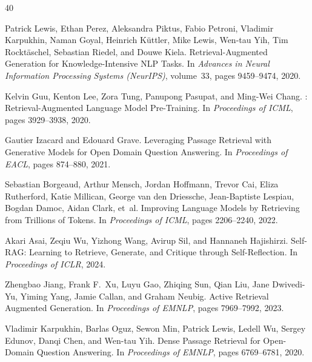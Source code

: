 \documentclass[11pt]{article}
\begin{document}

\begin{thebibliography}{40}


Patrick Lewis, Ethan Perez, Aleksandra Piktus, Fabio Petroni, Vladimir
Karpukhin, Naman Goyal, Heinrich K\"{u}ttler, Mike Lewis, Wen-tau Yih,
Tim Rockt\"{a}schel, Sebastian Riedel, and Douwe Kiela.
\newblock Retrieval-Augmented Generation for Knowledge-Intensive {NLP} Tasks.
\newblock In \emph{Advances in Neural Information Processing Systems
(NeurIPS)}, volume~33, pages 9459--9474, 2020.

Kelvin Guu, Kenton Lee, Zora Tung, Panupong Pasupat, and Ming-Wei Chang.
: Retrieval-Augmented Language Model Pre-Training.
\newblock In \emph{Proceedings of ICML}, pages 3929--3938, 2020.

Gautier Izacard and Edouard Grave.
\newblock Leveraging Passage Retrieval with Generative Models for Open Domain
Question Answering.
\newblock In \emph{Proceedings of EACL}, pages 874--880, 2021.

Sebastian Borgeaud, Arthur Mensch, Jordan Hoffmann, Trevor Cai, Eliza
Rutherford, Katie Millican, George van den Driessche, Jean-Baptiste Lespiau,
Bogdan Damoc, Aidan Clark, et~al.
\newblock Improving Language Models by Retrieving from Trillions of Tokens.
\newblock In \emph{Proceedings of ICML}, pages 2206--2240, 2022.

Akari Asai, Zeqiu Wu, Yizhong Wang, Avirup Sil, and Hannaneh Hajishirzi.
\newblock Self-{RAG}: Learning to Retrieve, Generate, and Critique through
Self-Reflection.
\newblock In \emph{Proceedings of ICLR}, 2024.

Zhengbao Jiang, Frank F.\ Xu, Luyu Gao, Zhiqing Sun, Qian Liu, Jane
Dwivedi-Yu, Yiming Yang, Jamie Callan, and Graham Neubig.
\newblock Active Retrieval Augmented Generation.
\newblock In \emph{Proceedings of EMNLP}, pages 7969--7992, 2023.


Vladimir Karpukhin, Barlas Oguz, Sewon Min, Patrick Lewis, Ledell Wu, Sergey
Edunov, Danqi Chen, and Wen-tau Yih.
\newblock Dense Passage Retrieval for Open-Domain Question Answering.
\newblock In \emph{Proceedings of EMNLP}, pages 6769--6781, 2020.


\end{thebibliography}
\end{document}

